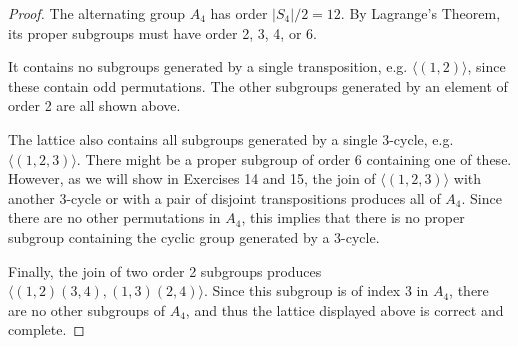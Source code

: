 \documentclass{article}
\begin{document}

\begin{proof}
    The alternating group $A_4$ has order $|S_4|/2 = 12$. By Lagrange's Theorem, its proper subgroups must have order 2, 3, 4, or 6.

    It contains no subgroups generated by a single transposition, e.g. $\langle (1, 2) \rangle$, since these contain odd permutations. The other subgroups generated by an element of order 2 are all shown above.

    The lattice also contains all subgroups generated by a single 3-cycle, e.g. $\langle (1, 2, 3) \rangle$. There might be a proper subgroup of order 6 containing one of these. However, as we will show in Exercises 14 and 15, the join of $\langle (1, 2, 3) \rangle$ with another 3-cycle or with a pair of disjoint transpositions produces all of $A_4$. Since there are no other permutations in $A_4$, this implies that there is no proper subgroup containing the cyclic group generated by a 3-cycle.

    Finally, the join of two order 2 subgroups produces $\langle (1, 2)(3, 4), (1, 3)(2, 4) \rangle$. Since this subgroup is of index 3 in $A_4$, there are no other subgroups of $A_4$, and thus the lattice displayed above is correct and complete.
\end{proof}
\end{document}
